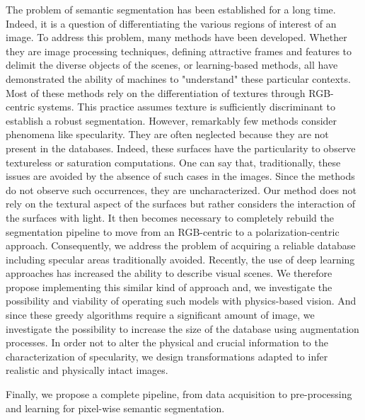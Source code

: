 The problem of semantic segmentation has been established for a long time. Indeed, it is a question of differentiating the various regions of interest of an image. To address this problem, many methods have been developed.
Whether they are image processing techniques, defining attractive frames and features to delimit the diverse objects of the scenes, or learning-based methods, all have demonstrated the ability of machines to "understand" these particular contexts. Most of these methods rely on the differentiation of textures through RGB-centric systems. This practice assumes texture is sufficiently discriminant to establish a robust segmentation. However, remarkably few methods consider phenomena like specularity. They are often neglected because they are not present in the databases. Indeed, these surfaces have the particularity to observe textureless or saturation computations. One can say that, traditionally, these issues are avoided by the absence of such cases in the images. Since the methods do not observe such occurrences, they are uncharacterized.
Our method does not rely on the textural aspect of the surfaces but rather considers the interaction of the surfaces with light.
It then becomes necessary to completely rebuild the segmentation pipeline to move from an RGB-centric to a polarization-centric approach. Consequently, we address the problem of acquiring a reliable database including specular areas traditionally avoided. 
Recently, the use of deep learning approaches has increased the ability to describe visual scenes. We therefore propose implementing this similar kind of approach and, we investigate the possibility and viability of operating such models with physics-based vision. 
And since these greedy algorithms require a significant amount of image, we investigate the possibility to increase the size of the database using augmentation processes. In order not to alter the physical and crucial information to the characterization of specularity, we design transformations adapted to infer realistic and physically intact images.

Finally, we propose a complete pipeline, from data acquisition to pre-processing and learning for pixel-wise semantic segmentation.

